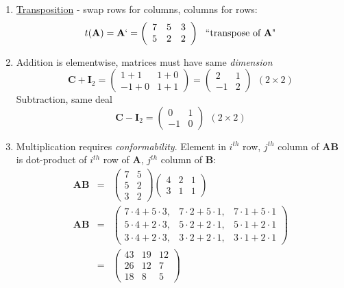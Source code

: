 \begin{enumerate}
\item \underline{Transposition} - swap rows for columns, columns for rows:
\[
t(\textbf{A}) = \textbf{A}` =
\left(\begin{array}{ccc} 7 & 5 & 3 \\ 5 & 2 & 2 \end{array}\right) \ \ \mbox{``transpose of $\textbf{A}$"}
\]
\item
Addition is elementwise, matrices must have same {\em dimension}
\[ 
\textbf{C} + \textbf{I}_2 = 
\left(\begin{array}{cc} 1 + 1 & 1 + 0 \\ -1 + 0  & 1 + 1 \end{array}\right) 
=
\left(\begin{array}{cc} 2 & 1 \\ -1 & 2 \end{array}\right) \ \ (2 \times 2)
\]
Subtraction, same deal
\[ 
\textbf{C} - \textbf{I}_2 = \left(\begin{array}{cc} 0 & 1 \\ -1 & 0 \end{array}\right) \ \ (2 \times 2)
\]
\item
Multiplication requires {\em conformability}.  Element in $i^{th}$ row, $j^{th}$ column of $\textbf{AB}$ is dot-product of $i^{th}$ row of $\textbf{A}$, $j^{th}$ column of $\textbf{B}$:
\[ 
\begin{array}{ccc}
\textbf{AB} & = & 
\left(\begin{array}{cc} 7 & 5 \\ 5 & 2 \\ 3 & 2 \end{array}\right)  
\left(\begin{array}{ccc} 4 & 2 & 1 \\ 3 & 1 & 1 \end{array}\right)  
\\
\textbf{AB} & = & \left(\begin{array}{ccc} 
7 \cdot 4 + 5 \cdot 3, & 
7 \cdot 2 + 5 \cdot 1, & 
7 \cdot 1 + 5 \cdot 1 \\
5 \cdot 4 + 2 \cdot 3, & 
5 \cdot 2 + 2 \cdot 1, & 
5 \cdot 1 + 2 \cdot 1 \\
3 \cdot 4 + 2 \cdot 3, & 
3 \cdot 2 + 2 \cdot 1, & 
3 \cdot 1 + 2 \cdot 1 \end{array}\right) \\
& = & \left(\begin{array}{ccc} 43 & 19 & 12 \\ 26 & 12 & 7 \\ 18 & 8 & 5 \end{array}\right) \end{array}
\] 


\end{enumerate}
